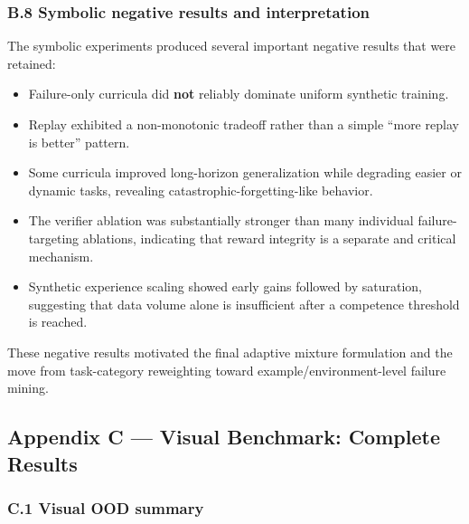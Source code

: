 \documentclass[
]{article}
\providecommand{\tightlist}{%
  \setlength{\itemsep}{0pt}\setlength{\parskip}{0pt}}
\begin{document}
\subsubsection{B.8 Symbolic negative results and
interpretation}\label{b.8-symbolic-negative-results-and-interpretation}

The symbolic experiments produced several important negative results
that were retained:

\begin{itemize}
\tightlist
\item
  Failure-only curricula did \textbf{not} reliably dominate uniform
  synthetic training.
\item
  Replay exhibited a non-monotonic tradeoff rather than a simple ``more
  replay is better'' pattern.
\item
  Some curricula improved long-horizon generalization while degrading
  easier or dynamic tasks, revealing catastrophic-forgetting-like
  behavior.
\item
  The verifier ablation was substantially stronger than many individual
  failure-targeting ablations, indicating that reward integrity is a
  separate and critical mechanism.
\item
  Synthetic experience scaling showed early gains followed by
  saturation, suggesting that data volume alone is insufficient after a
  competence threshold is reached.
\end{itemize}

These negative results motivated the final adaptive mixture formulation
and the move from task-category reweighting toward
example/environment-level failure mining.

\subsection{Appendix C --- Visual Benchmark: Complete
Results}\label{appendix-c-visual-benchmark-complete-results}

\subsubsection{C.1 Visual OOD summary}\label{c.1-visual-ood-summary}
\end{document}

